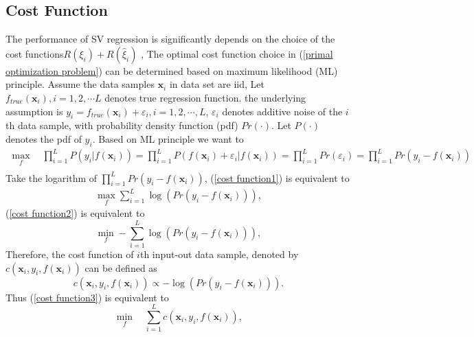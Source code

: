 \subsection{Cost Function}\label{cost function}
The performance of SV regression is significantly depends on the choice of the cost functions$R(\xi_{i})+R(\hat{\xi}_{i})$ \cite{smola1998connection}\cite{muller1997predicting}, 
The optimal cost function choice in (\ref{primal optimization problem}) can be determined based on maximum likelihood (ML) principle. Assume the data samples $\mathbf{x}_{i}$ in data set are iid, Let $f_{true}(\mathbf{x}_{i}), i=1,2,\cdots L$ denotes true regression function. the underlying assumption is $y_{i}=f_{true}(\mathbf{x}_{i})+\varepsilon_{i}, i=1,2,\cdots, L$, $\varepsilon_{i}$ denotes additive noise of the $i$th data sample, with probability density function (pdf) $Pr(\cdot)$. Let $P(\cdot)$ denotes the pdf of $y_{i}$. Based on ML principle we want to 
\begin{eqnarray}
\nonumber
\max_{f}\quad \prod_{i=1}^{L}P(y_{i}|f(\mathbf{x}_{i}))=\prod_{i=1}^{L}P(f(\mathbf{x}_{i})+\varepsilon_{i}|f(\mathbf{x}_{i}))=\prod_{i=1}^{L}Pr(\varepsilon_{i})=\prod_{i=1}^{L}Pr(y_{i}-f(\mathbf{x}_{i}))\\
\label{cost function1}
\end{eqnarray}
Take the logarithm of $\prod_{i=1}^{L}Pr(y_{i}-f(\mathbf{x}_{i}))$, (\ref{cost function1}) is equivalent to 
\begin{eqnarray}
\max_{f} \sum_{i=1}^{L}\log(Pr(y_{i}-f(\mathbf{x}_{i}))),
\label{cost function2}
\end{eqnarray}
(\ref{cost function2}) is equivalent to 
\begin{equation}
\min_{f}-\sum_{i=1}^{L}\log(Pr(y_{i}-f(\mathbf{x}_{i}))),
\label{cost function3}
\end{equation}
Therefore, the cost function of $i$th input-out data sample, denoted by  $c(\mathbf{x}_{i}, y_{i}, f(\mathbf{x}_{i}))$ can be defined as 
\begin{equation}
c(\mathbf{x}_{i}, y_{i}, f(\mathbf{x}_{i}))\varpropto -\log(Pr(y_{i}-f(\mathbf{x}_{i}))).
\label{cost function4}
\end{equation}
Thus (\ref{cost function3}) is equivalent to 
\begin{equation}
\min_{f}\quad  \sum_{i=1}^{L}c(\mathbf{x}_{i}, y_{i}, f(\mathbf{x}_{i})),
\label{Total risk function}
\end{equation} 
